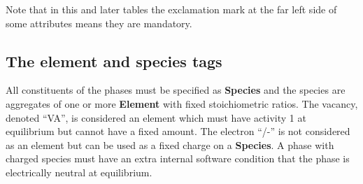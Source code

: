 \documentclass{article}
\begin{document}
Note that in this and later tables the exclamation mark at the far
left side of some attributes means they are mandatory.

\newpage

\subsection{The element and species tags}\label{sec:elements}

All constituents of the phases must be specified as {\bf Species} and
the species are aggregates of one or more {\bf Element} with fixed
stoichiometric ratios.  The vacancy, denoted ``VA'', is considered an
element which must have activity 1 at equilibrium but cannot have a
fixed amount.  The electron ``/-'' is not considered as an element but
can be used as a fixed charge on a {\bf Species}.  A phase with
charged species must have an extra internal software condition that
the phase is electrically neutral at equilibrium.
\end{document}
